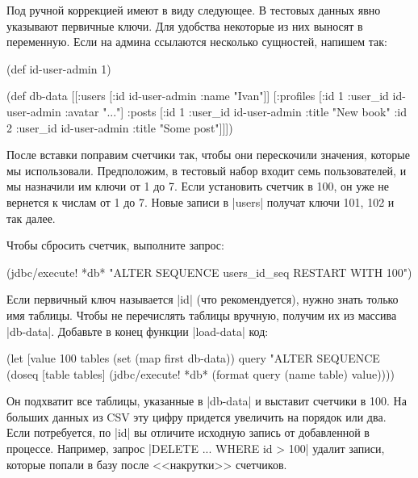 Под ручной коррекцией имеют в виду следующее. В тестовых данных явно указывают
первичные ключи. Для удобства некоторые из них выносят в переменную. Если на
админа ссылаются несколько сущностей, напишем так:

\begin{english}
  \begin{clojure}
(def id-user-admin 1)

(def db-data
  [[:users [{:id id-user-admin :name "Ivan"}]]
   [:profiles [{:id 1 :user_id id-user-admin :avatar "..."}]
    :posts [{:id 1 :user_id id-user-admin :title "New book"}
            {:id 2 :user_id id-user-admin :title "Some post"}]]])
  \end{clojure}
\end{english}

После вставки поправим счетчики так, чтобы они перескочили значения, которые мы
использовали. Предположим, в тестовый набор входит семь пользователей, и мы
назначили им ключи от 1 до 7. Если установить счетчик в 100, он уже не вернется
к числам от 1 до 7. Новые записи в \spverb|users| получат ключи 101, 102 и так
далее.

Чтобы сбросить счетчик, выполните запрос:

\begin{english}
  \begin{clojure}
(jdbc/execute! *db* "ALTER SEQUENCE users_id_seq RESTART WITH 100")
  \end{clojure}
\end{english}

Если первичный ключ называется \spverb|id| (что рекомендуется), нужно знать
только имя таблицы. Чтобы не перечислять таблицы вручную, получим их из массива
\spverb|db-data|. Добавьте в конец функции \spverb|load-data| код:

\begin{english}
  \begin{clojure}
(let [value 100
      tables (set (map first db-data))
      query "ALTER SEQUENCE %
  (doseq [table tables]
    (jdbc/execute! *db* (format query (name table) value))))
  \end{clojure}
\end{english}

Он подхватит все таблицы, указанные в \spverb|db-data| и выставит счетчики в
100. На больших данных из CSV эту цифру придется увеличить на порядок или
два. Если потребуется, по \spverb|id| вы отличите исходную запись от добавленной
в процессе. Например, запрос \spverb|DELETE ... WHERE id > 100| удалит записи,
которые попали в базу после <<накрутки>> счетчиков.

